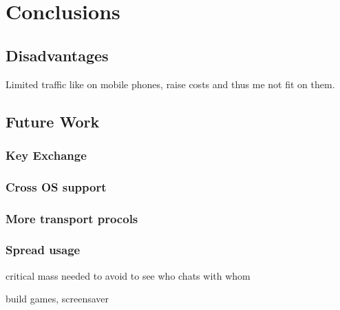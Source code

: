 \section{Conclusions}
\subsection{Disadvantages}
Limited traffic like on mobile phones, raise costs and thus me not
fit on them.
\subsection{Future Work}
\subsubsection{Key Exchange}
\subsubsection{Cross OS support}
\subsubsection{More transport procols}
\subsubsection{Spread usage}
critical mass needed to avoid to see who chats with whom

build games, screensaver


